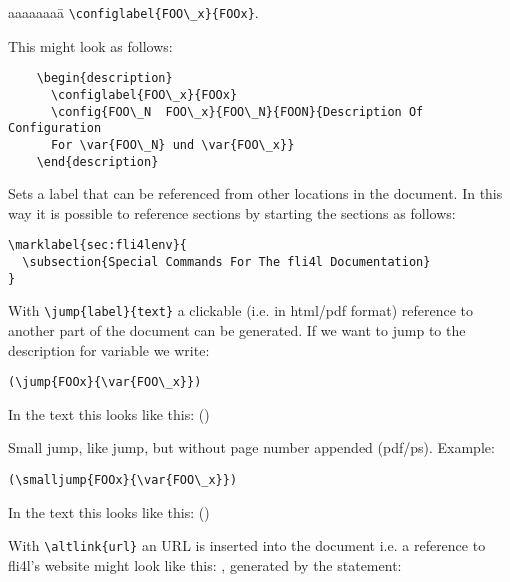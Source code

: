 \begin{description}
  \begin{tabbing}
    aaaaaaaa\=\kill
    \>\verb*?\configlabel{FOO\_x}{FOOx}?.
  \end{tabbing}

  This might look as follows:

\begin{verbatim}
    \begin{description}
      \configlabel{FOO\_x}{FOOx}
      \config{FOO\_N  FOO\_x}{FOO\_N}{FOON}{Description Of Configuration
      For \var{FOO\_N} und \var{FOO\_x}}
    \end{description}
\end{verbatim}

\item [marklabel] Sets a label that can be referenced from other
  locations in the document. In this way it is possible to reference
  sections by starting the sections as follows:
\begin{verbatim}
\marklabel{sec:fli4lenv}{
  \subsection{Special Commands For The fli4l Documentation}
}
\end{verbatim}

\item [jump] With \verb*?\jump{label}{text}? a clickable (i.e. in html/pdf format)
reference to another part of the document can be generated. If we want to jump to
the description for variable  we write:
\begin{verbatim}
(\jump{FOOx}{\var{FOO\_x}})
\end{verbatim}

In the text this looks like this: ()

\item [smalljump] \glqq{}Small jump\grqq{}, like jump, but without page
number appended (pdf/ps). Example:
\begin{verbatim}
(\smalljump{FOOx}{\var{FOO\_x}})
\end{verbatim}

In the text this looks like this: ()

\item [altlink] With \verb*?\altlink{url}? an URL is inserted into the document
  i.e. a reference to fli4l's website might look like this:
  , generated by the statement:


\end{description}
